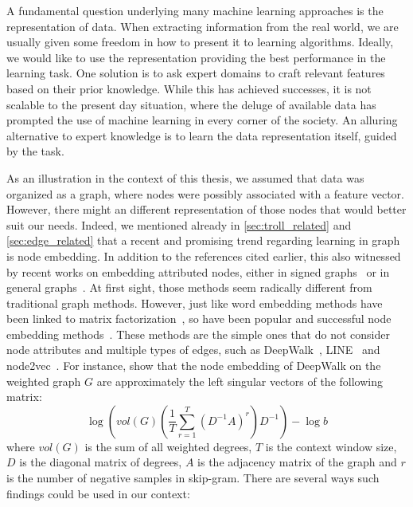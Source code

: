 A fundamental question underlying many machine learning approaches is the representation of data.
When extracting information from the real world, we are usually given some freedom in how to present
it to learning algorithms. Ideally, we would like to use the representation providing the best
performance in the learning task. One solution is to ask expert domains to craft relevant features
based on their prior knowledge. While this has achieved successes, it is not scalable to the present
day situation, where the deluge of available data has prompted the use of machine learning in every
corner of the society. An alluring alternative to expert knowledge is to learn the data
representation itself, guided by the task.

As an illustration in the context of this thesis, we assumed that data was organized as a graph,
where nodes were possibly associated with a feature vector. However, there might an different
representation of those nodes that would better suit our needs. Indeed,
we mentioned already in \autoref{sec:troll_related} and \autoref{sec:edge_related} that a recent and
promising trend regarding learning in graph is node embedding. In addition to the references cited
earlier, this also witnessed by recent works on embedding attributed nodes, either in signed
graphs~\autocites{SignedFS17}{attributedSNE17}{SHINE18} or in general
graphs~\autocites{Liao2017}{AANE17}{DynamicEmbedding17}. At first sight, those methods seem
radically different from traditional graph methods. However, just like word embedding methods have
been linked to matrix
factorization~\autocites{WordEmbeddingAsFactorization14}{Hellinger14}{AroraRandWalk16}, so have been
popular and successful node embedding methods~\autocite{embeddingAsFactorization18}. These methods
are the simple ones that do not consider node attributes and multiple types of edges, such as
DeepWalk~\autocite{DeepWalk14}, LINE~\autocite{LINE15} and node2vec~\autocite{node2vec16}. For
instance, \textcite{embeddingAsFactorization18} show that the node embedding of DeepWalk on the
weighted graph $G$ are approximately the left singular vectors of the following matrix:
\begin{equation}
  \label{eq:deepwalk}
  \log \left( vol(G) \left( \frac{1}{T} \sum_{r=1}^T (D^{-1}A)^r\right) D^{-1} \right) - \log b
\end{equation}
where $vol(G)$ is the sum of all weighted degrees, $T$ is the context window size, $D$ is the
diagonal matrix of degrees, $A$ is the adjacency matrix of the graph and $r$ is the number of
negative samples in skip-gram. There are several ways such findings could be used in our context:
